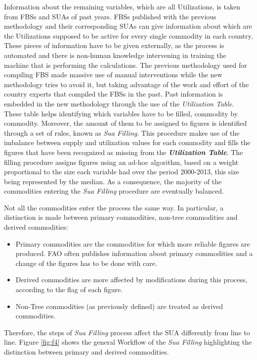 \documentclass[]{article}
\providecommand{\tightlist}{%
  \setlength{\itemsep}{0pt}\setlength{\parskip}{0pt}}
\begin{document}
Information about the remaining variables, which are all Utilizations,
is taken from FBSs and SUAs of past years. FBSs published with the
previous methodology and their corresponding SUAs can give information
about which are the Utilizations supposed to be active for every single
commodity in each country.\\
These pieces of information have to be given externally, as the process
is automated and there is non-human knowledge intervening in training
the machine that is performing the calculations. The previous
methodology used for compiling FBS made massive use of manual
interventions while the new methodology tries to avoid it, but taking
advantage of the work and effort of the country experts that compiled
the FBSs in the past. Past information is embedded in the new
methodology through the use of the \emph{Utilization Table}. These table
helps identifying which variables have to be filled, commodity by
commodity. Moreover, the amount of them to be assigned to figures is
identified through a set of rules, known as \emph{Sua Filling}. This
procedure makes use of the imbalance between supply and utilization
values for each commodity and fills the figures that have been
recognized as missing from the \textbf{\emph{Utilization Table}}. The
filling procedure assigns figures using an ad-hoc algorithm, based on a
weight proportional to the size each variable had over the period
2000-2013, this size being represented by the median. As a consequence,
the majority of the commodities entering the \emph{Sua Filling}
procedure are eventually balanced.

Not all the commodities enter the process the same way. In particular, a
distinction is made between primary commodities, non-tree commodities
and derived commodities:

\begin{itemize}
\tightlist
\item
  Primary commodities are the commodities for which more reliable
  figures are produced. FAO often publishes information about primary
  commodities and a change of the figures has to be done with care.
\item
  Derived commodities are more affected by modifications during this
  process, according to the flag of each figure.
\item
  Non-Tree commodities (as previously defined) are treated as derived
  commodities.
\end{itemize}

Therefore, the steps of \emph{Sua Filling} process affect the SUA
differently from line to line. Figure \ref{fig:f4} shows the general
Workflow of the \emph{Sua Filling} highlighting the distinction between
primary and derived commodities.
\end{document}
